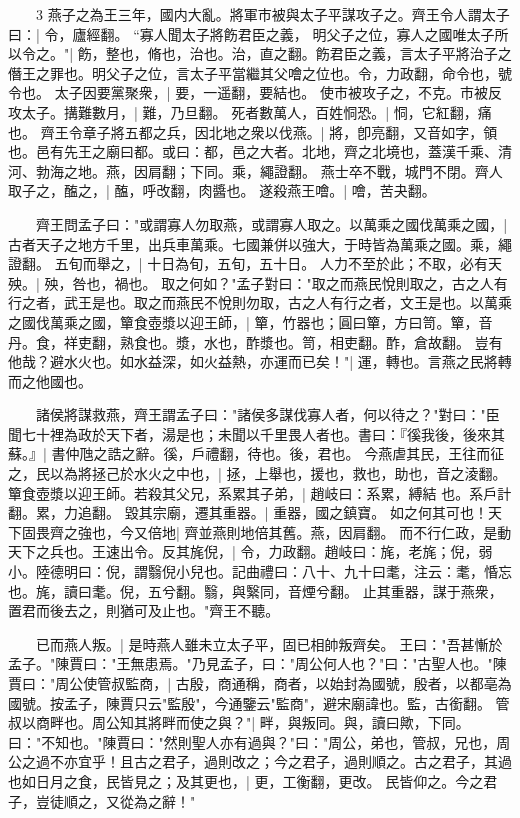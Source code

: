 　　3 燕子之為王三年，國内大亂。將軍市被與太子平謀攻子之。齊王令人謂太子曰：|{
	令，廬經翻。
	}
“寡人聞太子將飭君臣之義，
明父子之位，寡人之國唯太子所以令之。"|{
	飭，整也，脩也，治也。治，直之翻。飭君臣之義，言太子平將治子之僭王之罪也。明父子之位，言太子平當繼其父噲之位也。令，力政翻，命令也，號令也。
	}
太子因要黨聚衆，|{
	要，一遥翻，要結也。
	}
使市被攻子之，不克。市被反攻太子。搆難數月，|{
	難，乃旦翻。
	}
死者數萬人，百姓恫恐。|{
	恫，它紅翻，痛也。
	}
齊王令章子將五都之兵，因北地之衆以伐燕。|{
	將，卽亮翻，又音如字，領也。邑有先王之廟曰都。或曰：都，邑之大者。北地，齊之北境也，蓋漢千乘、清河、勃海之地。燕，因肩翻；下同。乘，繩證翻。
	}
燕士卒不戰，城門不閉。齊人取子之，醢之，|{
	醢，呼改翻，肉醬也。
	}
遂殺燕王噲。|{
	噲，苦夬翻。
	}

　　齊王問孟子曰："或謂寡人勿取燕，或謂寡人取之。以萬乘之國伐萬乘之國，|{
	古者天子之地方千里，出兵車萬乘。七國兼併以強大，于時皆為萬乘之國。乘，繩證翻。
	}
五旬而舉之，|{
	十日為旬，五旬，五十日。
	}
人力不至於此；不取，必有天殃。|{
	殃，咎也，禍也。
	}
取之何如？"孟子對曰："取之而燕民悅則取之，古之人有行之者，武王是也。取之而燕民不悅則勿取，古之人有行之者，文王是也。以萬乘之國伐萬乘之國，簞食壺漿以迎王師，|{
	簞，竹器也；圓曰簞，方曰笥。簞，音丹。食，祥吏翻，熟食也。漿，水也，酢漿也。笥，相吏翻。酢，倉故翻。
	}
豈有他哉？避水火也。如水益深，如火益熱，亦運而已矣！"|{
	運，轉也。言燕之民將轉而之他國也。
	}

　　諸侯將謀救燕，齊王謂孟子曰："諸侯多謀伐寡人者，何以待之？"對曰："臣聞七十裡為政於天下者，湯是也；未聞以千里畏人者也。書曰：『徯我後，後來其蘇。』|{
	書仲虺之誥之辭。徯，戶禮翻，待也。後，君也。
	}
今燕虐其民，王往而征之，民以為將拯己於水火之中也，|{
	拯，上舉也，援也，救也，助也，音之淩翻。
	}
簞食壺漿以迎王師。若殺其父兄，系累其子弟，|{
	趙岐曰：系累，縛結 也。系戶計翻。累，力追翻。
	}
毀其宗廟，遷其重器。|{
	重器，國之鎮寶。
	}
如之何其可也！天下固畏齊之強也，今又倍地|{
	齊並燕則地倍其舊。燕，因肩翻。
	}
而不行仁政，是動天下之兵也。王速出令。反其旄倪，|{
	令，力政翻。趙岐曰：旄，老旄；倪，弱小。陸德明曰：倪，謂翳倪小兒也。記曲禮曰：八十、九十曰耄，注云：耄，惛忘也。旄，讀曰耄。倪，五兮翻。翳，與繄同，音煙兮翻。
	}
止其重器，謀于燕衆，置君而後去之，則猶可及止也。"齊王不聽。

　　已而燕人叛。|{
	是時燕人雖未立太子平，固已相帥叛齊矣。
	}
王曰："吾甚慚於孟子。"陳賈曰："王無患焉。"乃見孟子，曰："周公何人也？"曰："古聖人也。"陳賈曰："周公使管叔監商，|{
	古殷，商通稱，商者，以始封為國號，殷者，以都亳為國號。按孟子，陳賈只云"監殷"，今通鑒云"監商"，避宋廟諱也。監，古銜翻。
	}
管叔以商畔也。周公知其將畔而使之與？"|{
	畔，與叛同。與，讀曰歟，下同。
	}
曰："不知也。"陳賈曰："然則聖人亦有過與？"曰："周公，弟也，管叔，兄也，周公之過不亦宜乎！且古之君子，過則改之；今之君子，過則順之。古之君子，其過也如日月之食，民皆見之；及其更也，|{
	更，工衡翻，更改。
	}
民皆仰之。今之君子，豈徒順之，又從為之辭！"

